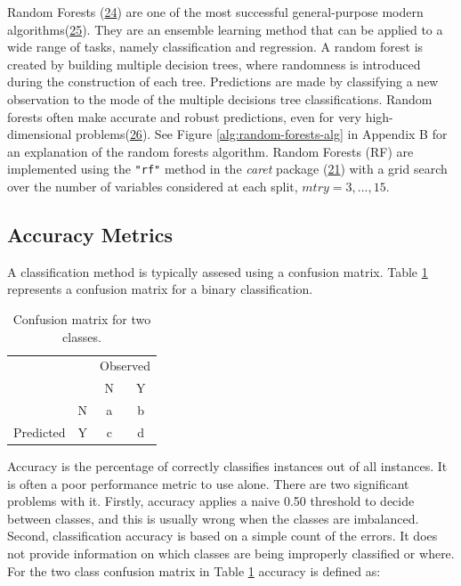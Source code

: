 \documentclass[12pt,]{article}
\begin{document}
Random Forests (\protect\hyperlink{ref-breiman_random_2001}{24}) are one
of the most successful general-purpose modern
algorithms(\protect\hyperlink{ref-biau_random_2016}{25}). They are an
ensemble learning method that can be applied to a wide range of tasks,
namely classification and regression. A random forest is created by
building multiple decision trees, where randomness is introduced during
the construction of each tree. Predictions are made by classifying a new
observation to the mode of the multiple decisions tree classifications.
Random forests often make accurate and robust predictions, even for very
high-dimensional
problems(\protect\hyperlink{ref-biau_analysis_2012}{26}). See Figure
\ref{alg:random-forests-alg} in Appendix B for an explanation of the
random forests algorithm. Random Forests (RF) are implemented using the
\texttt{"rf"} method in the \emph{caret} package
(\protect\hyperlink{ref-wing_caret:_2019}{21}) with a grid search over
the number of variables considered at each split, \(mtry=3,...,15\).

\subsection{Accuracy Metrics}\label{accuracy-metrics}

A classification method is typically assesed using a confusion matrix.
Table \ref{tab:confusion-matrix} represents a confusion matrix for a
binary classification.

\begin{table}[!h]

\caption{\label{tab:unnamed-chunk-1}\label{tab:confusion-matrix} Confusion matrix for two classes.}
\centering
\fontsize{12}{14}\selectfont
\begin{tabular}{lc|cc}
\toprule
\multicolumn{2}{c}{ } & \multicolumn{2}{c}{Observed} \\
\cmidrule(l{3pt}r{3pt}){3-4}
  &   & N & Y\\
\midrule
\rowcolor{gray!6}   & N & a & b\\

\multirow{-2}{*}{\raggedright\arraybackslash Predicted} & Y & c & d\\
\bottomrule
\end{tabular}
\end{table}

Accuracy is the percentage of correctly classifies instances out of all
instances. It is often a poor performance metric to use alone. There are
two significant problems with it. Firstly, accuracy applies a naive 0.50
threshold to decide between classes, and this is usually wrong when the
classes are imbalanced. Second, classification accuracy is based on a
simple count of the errors. It does not provide information on which
classes are being improperly classified or where. For the two class
confusion matrix in Table \ref{tab:confusion-matrix} accuracy is defined
as:
\end{document}
